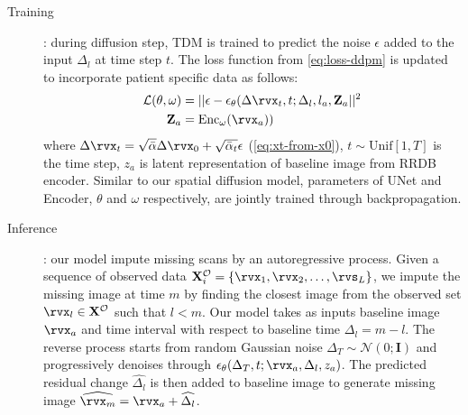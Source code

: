 \begin{description}
    \item[Training]: during diffusion step, TDM is trained to predict the noise $\epsilon$ added to the input $\Delta_l$ at time step $t$. The loss function from \cref{eq:loss-ddpm} is updated to incorporate patient specific data as follows: 
    \begin{equation}
    \label{eq:loss-tdm}
        \begin{aligned}
        \mathcal{L} (\theta, \omega) &= ||\epsilon - \epsilon_{\theta} (\Delta\rvx_t, t; \Delta_l, l_a, \mathbf{Z}_a ||^2 \\
        \mathbf{Z}_a &= \mathrm{Enc_{\omega}}(\rvx_a))
        \end{aligned}
    \end{equation}
    where $\Delta\rvx_t = \sqrt{\bar\alpha} \Delta\rvx_0 + \sqrt{\bar\alpha_t} \epsilon$ (\cref{eq:xt-from-x0}), $t \sim \mathrm{Unif}[1, T]$ is the time step, $z_a$ is latent representation of baseline image from RRDB encoder. Similar to our spatial diffusion model, parameters of UNet and Encoder, $\theta$ and $\omega$ respectively, are jointly trained through backpropagation. 
    
    \item[Inference]: our model impute missing scans by an autoregressive process. Given a sequence of observed data $\mathbf{X}^{\mathcal{O}}_{i} = \{\rvx_1, \rvx_2, \dots, \rvs_L\}$, we impute the missing image at time $m$ by finding the closest image from the observed set $\rvx_l \in \mathbf{X}^{\mathcal{O}}$ such that $l < m$. Our model takes as inputs baseline image $\rvx_a$ and time interval with respect to baseline time $\Delta_l = m -l$. The reverse process starts from random Gaussian noise $\Delta_T \sim \mathcal{N}(0; \mathbf{I})$ and progressively denoises through $\epsilon_{\theta}(\Delta_T, t; \rvx_a, \Delta_l, z_a)$. The predicted residual change $\widehat{\Delta_l}$ is then added to baseline image to generate missing image $\widehat{\rvx_m} = \rvx_a + \widehat{\Delta_l}$. 
\end{description}